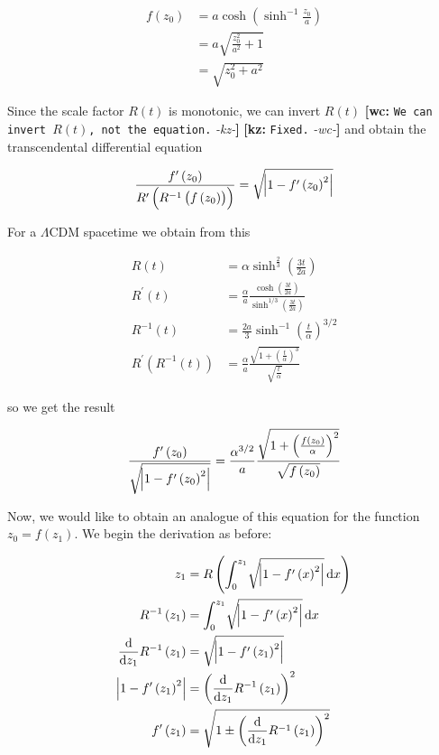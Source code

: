 \documentclass[preprint,notitlepage,amsmath,amssymb,floatfix]{revtex4-1}
\newcommand{\XXX}[3]{{\bf [#1: } {\tt #3} {\it -#2-}{\bf ]}}
\begin{document}
\begin{equation}
\begin{split}
f\left(z_0\right) &= a\cosh\left(\sinh^{-1}\frac{z_0}{a}\right) \\
&= a\sqrt{\frac{z_0^2}{a^2}+1} \\
&= \sqrt{z_0^2+a^2}
\end{split}
\end{equation}

\noindent Since the scale factor $R\left(t\right)$ is monotonic, we can invert $R\left(t\right)$ \XXX{wc}{kz}{We can invert $R(t)$, not the equation.} \XXX{kz}{wc}{Fixed.} and obtain the transcendental differential equation

\begin{equation}
\frac{f^\prime\left(z_0\right)}{R^\prime\left(R^{-1}\left(f\left(z_0\right)\right)\right)} = \sqrt{\abs{1 - f^\prime\left(z_0\right)^2}}
\end{equation}

\noindent For a $\Lambda$CDM spacetime we obtain from this

\begin{align}
R\left(t\right) &= \alpha\sinh^\frac{2}{3}\left(\frac{3t}{2a}\right) \\
R^\prime\left(t\right) &= \frac{\alpha}{a}\frac{\cosh\left(\frac{3t}{2a}\right)}{\sinh^{1/3}\left(\frac{3t}{2a}\right)} \\
R^{-1}\left(t\right) &= \frac{2a}{3}\sinh^{-1}\left(\frac{t}{\alpha}\right)^{3/2} \\
R^\prime\left(R^{-1}\left(t\right)\right) &= \frac{\alpha}{a}\frac{\sqrt{1+\left(\frac{t}{\alpha}\right)^3}}{\sqrt{\frac{t}{\alpha}}}
\end{align}

\noindent so we get the result

\begin{equation}
\frac{f^\prime\left(z_0\right)}{\sqrt{\abs{1-f^\prime\left(z_0\right)^2}}} = \frac{\alpha^{3/2}}{a}\frac{\sqrt{1+\left(\frac{f\left(z_0\right)}{\alpha}\right)^2}}{\sqrt{f\left(z_0\right)}}
\end{equation}

Now, we would like to obtain an analogue of this equation for the function $z_0 = f\left(z_1\right)$.  We begin the derivation as before:

\begin{align}
z_1 &= R\left(\int_0^{z_1}\!\sqrt{\abs{1-f^\prime\left(x\right)^2}}\,\mathrm dx\right) \\
R^{-1}\left(z_1\right) &= \int_0^{z_1}\!\sqrt{\abs{1-f^\prime\left(x\right)^2}}\,\mathrm dx \\
\frac{\mathrm d}{\mathrm dz_1}R^{-1}\left(z_1\right) &= \sqrt{\abs{1-f^\prime\left(z_1\right)^2}} \\
\abs{1-f^\prime\left(z_1\right)^2} &= \left(\frac{\mathrm d}{\mathrm dz_1}R^{-1}\left(z_1\right)\right)^2 \\
f^\prime\left(z_1\right) &= \sqrt{1\pm\left(\frac{\mathrm d}{\mathrm dz_1}R^{-1}\left(z_1\right)\right)^2}
\end{align}
\end{document}
